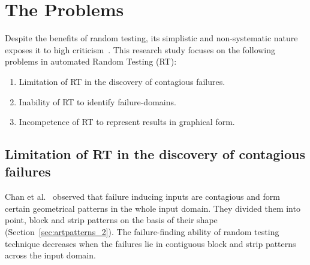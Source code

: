 \section{The Problems}
Despite the benefits of random testing, its simplistic and non-systematic nature exposes it to high criticism~\cite{white1987software, myers2011art}. This research study focuses on the following problems in automated Random Testing (RT):


\begin{enumerate}
\item Limitation of RT in the discovery of contagious failures.
\item Inability of RT to identify failure-domains.
\item Incompetence of RT to represent results in graphical form. 
\end{enumerate}

\subsection{Limitation of RT in the discovery of contagious failures}
Chan et al.~\cite{chan1996proportional} observed that failure inducing inputs are contagious and form certain geometrical patterns in the whole input domain. They divided them into point, block and strip patterns on the basis of their shape (Section~\ref{sec:artpatterns_2}). %
The failure-finding ability of random testing technique decreases when the failures lie in contiguous block and strip patterns across the input domain.


